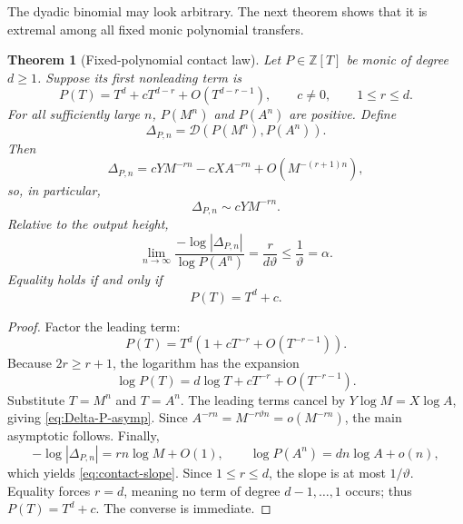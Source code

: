 \documentclass[11pt]{article}
\newtheorem{theorem}{Theorem}[section]
\theoremstyle{definition}
\newcommand{\Z}{\mathbb Z}
\newcommand{\vtheta}{\vartheta}
\newcommand{\Dlog}{\mathscr D}
\begin{document}
The dyadic binomial may look arbitrary.  The next theorem shows that it is extremal among
all fixed monic polynomial transfers.

\begin{theorem}[Fixed-polynomial contact law]\label{thm:polynomial-contact}
Let $P\in\Z[T]$ be monic of degree $d\ge1$.  Suppose its first nonleading term is
\begin{equation}\label{eq:P-first-term}
 P(T)=T^d+cT^{d-r}+O(T^{d-r-1}),
 \qquad c\ne0,
 \qquad 1\le r\le d.
\end{equation}
For all sufficiently large $n$, $P(M^n)$ and $P(A^n)$ are positive.  Define
\begin{equation}\label{eq:Delta-P}
 \Delta_{P,n}=\Dlog(P(M^n),P(A^n)).
\end{equation}
Then
\begin{equation}\label{eq:Delta-P-asymp}
 \Delta_{P,n}
 =cY M^{-rn}-cX A^{-rn}+O(M^{-(r+1)n}),
\end{equation}
so, in particular,
\begin{equation}\label{eq:Delta-P-main}
 \Delta_{P,n}\sim cY M^{-rn}.
\end{equation}
Relative to the output height,
\begin{equation}\label{eq:contact-slope}
 \lim_{n\to\infty}
 \frac{-\log|\Delta_{P,n}|}{\log P(A^n)}
 =\frac{r}{d\vtheta}
 \le\frac1{\vtheta}=\alpha.
\end{equation}
Equality holds if and only if
\begin{equation}\label{eq:binomial-only}
 P(T)=T^d+c.
\end{equation}
\end{theorem}

\begin{proof}
Factor the leading term:
\[
 P(T)=T^d\left(1+cT^{-r}+O(T^{-r-1})\right).
\]
Because $2r\ge r+1$, the logarithm has the expansion
\begin{equation}\label{eq:logP}
 \log P(T)=d\log T+cT^{-r}+O(T^{-r-1}).
\end{equation}
Substitute $T=M^n$ and $T=A^n$.  The leading terms cancel by
$Y\log M=X\log A$, giving \eqref{eq:Delta-P-asymp}.  Since
$A^{-rn}=M^{-r\vtheta n}=o(M^{-rn})$, the main asymptotic follows.  Finally,
\[
 -\log|\Delta_{P,n}|=rn\log M+O(1),
 \qquad
 \log P(A^n)=dn\log A+o(n),
\]
which yields \eqref{eq:contact-slope}.  Since $1\le r\le d$, the slope is at most
$1/\vtheta$.  Equality forces $r=d$, meaning no term of degree $d-1,\ldots,1$ occurs;
thus $P(T)=T^d+c$.  The converse is immediate.
\end{proof}
\end{document}
